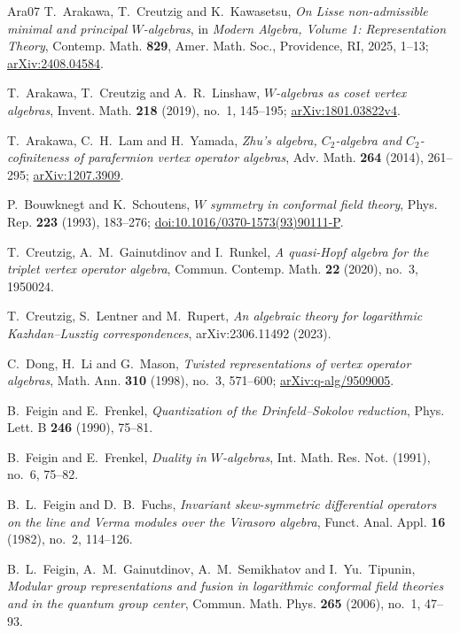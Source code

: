 \documentclass[11pt]{amsart}
\numberwithin{equation}{section}
\theoremstyle{definition}
\theoremstyle{remark}
\begin{document}
\begin{thebibliography}{Ara07}
T.~Arakawa, T.~Creutzig and K.~Kawasetsu,
\emph{On Lisse non-admissible minimal and principal $W$-algebras},
in \emph{Modern Algebra, Volume 1: Representation Theory},
Contemp. Math. \textbf{829}, Amer. Math. Soc., Providence, RI,
2025, 1--13;
\href{https://arxiv.org/abs/2408.04584}{arXiv:2408.04584}.

T.~Arakawa, T.~Creutzig and A.~R.~Linshaw,
\emph{$W$-algebras as coset vertex algebras},
Invent. Math. \textbf{218} (2019), no.~1, 145--195;
\href{https://arxiv.org/abs/1801.03822v4}{arXiv:1801.03822v4}.



T.~Arakawa, C.~H.~Lam and H.~Yamada,
\emph{Zhu's algebra, $C_2$-algebra and $C_2$-cofiniteness of
parafermion vertex operator algebras},
Adv. Math. \textbf{264} (2014), 261--295;
\href{https://arxiv.org/abs/1207.3909}{arXiv:1207.3909}.

P.~Bouwknegt and K.~Schoutens,
\emph{$W$ symmetry in conformal field theory},
Phys. Rep. \textbf{223} (1993), 183--276;
\href{https://doi.org/10.1016/0370-1573(93)90111-P}{doi:10.1016/0370-1573(93)90111-P}.

T.~Creutzig, A.~M.~Gainutdinov and I.~Runkel,
\emph{A quasi-Hopf algebra for the triplet vertex operator algebra},
Commun. Contemp. Math. \textbf{22} (2020), no.~3, 1950024.

T.~Creutzig, S.~Lentner and M.~Rupert,
\emph{An algebraic theory for logarithmic Kazhdan--Lusztig
correspondences},
arXiv:2306.11492 (2023).

C.~Dong, H.~Li and G.~Mason,
\emph{Twisted representations of vertex operator algebras},
Math. Ann. \textbf{310} (1998), no.~3, 571--600;
\href{https://arxiv.org/abs/q-alg/9509005}{arXiv:q-alg/9509005}.

B.~Feigin and E.~Frenkel,
\emph{Quantization of the Drinfeld--Sokolov reduction},
Phys. Lett. B \textbf{246} (1990), 75--81.

B.~Feigin and E.~Frenkel,
\emph{Duality in $W$-algebras},
Int. Math. Res. Not. (1991), no.~6, 75--82.

B.~L.~Feigin and D.~B.~Fuchs,
\emph{Invariant skew-symmetric differential operators on the line
and Verma modules over the Virasoro algebra},
Funct. Anal. Appl. \textbf{16} (1982), no.~2, 114--126.

B.~L.~Feigin, A.~M.~Gainutdinov, A.~M.~Semikhatov and I.~Yu.~Tipunin,
\emph{Modular group representations and fusion in logarithmic
conformal field theories and in the quantum group center},
Commun. Math. Phys. \textbf{265} (2006), no.~1, 47--93.


\end{thebibliography}
\end{document}
